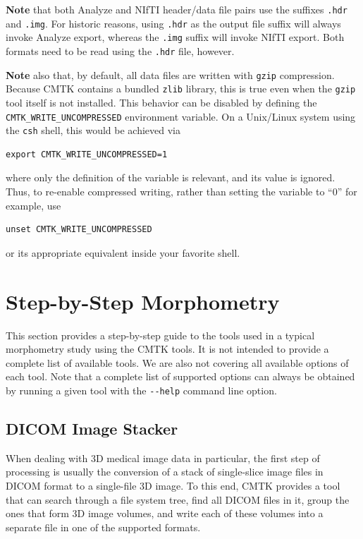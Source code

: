 \documentclass{InsightArticle}
\begin{document}
{\bf Note} that both Analyze and NIfTI header/data file pairs use the suffixes
\verb|.hdr| and \verb|.img|. For historic reasons, using \verb|.hdr| as the
output file suffix will always invoke Analyze export, whereas the \verb|.img|
suffix will invoke NIfTI export. Both formats need to be read using the
\verb|.hdr| file, however.

{\bf Note} also that, by default, all data files are written with \verb|gzip|
compression. Because CMTK contains a bundled \verb|zlib| library, this is true
even when the \verb|gzip| tool itself is not installed. This behavior can be
disabled by defining the \verb|CMTK_WRITE_UNCOMPRESSED| environment
variable. On a Unix/Linux system using the \verb|csh| shell, this would be
achieved via
\begin{verbatim}
export CMTK_WRITE_UNCOMPRESSED=1
\end{verbatim}
where only the definition of the variable is relevant, and its value is
ignored. Thus, to re-enable compressed writing, rather than setting the
variable to ``0'' for example, use
\begin{verbatim}
unset CMTK_WRITE_UNCOMPRESSED
\end{verbatim}
or its appropriate equivalent inside your favorite shell.

\clearpage
\section{Step-by-Step Morphometry}

This section provides a step-by-step guide to the tools used in a typical
morphometry study using the CMTK tools. It is not intended to provide a
complete list of available tools. We are also not covering all available
options of each tool. Note that a complete list of supported options can
always be obtained by running a given tool with the \verb|--help| command line
option.

\subsection{DICOM Image Stacker}

When dealing with 3D medical image data in particular, the first step of
processing is usually the conversion of a stack of single-slice image files in
DICOM format to a single-file 3D image. To this end, CMTK provides a tool that
can search through a file system tree, find all DICOM files in it, group the
ones that form 3D image volumes, and write each of these volumes into a
separate file in one of the supported formats.
\end{document}
